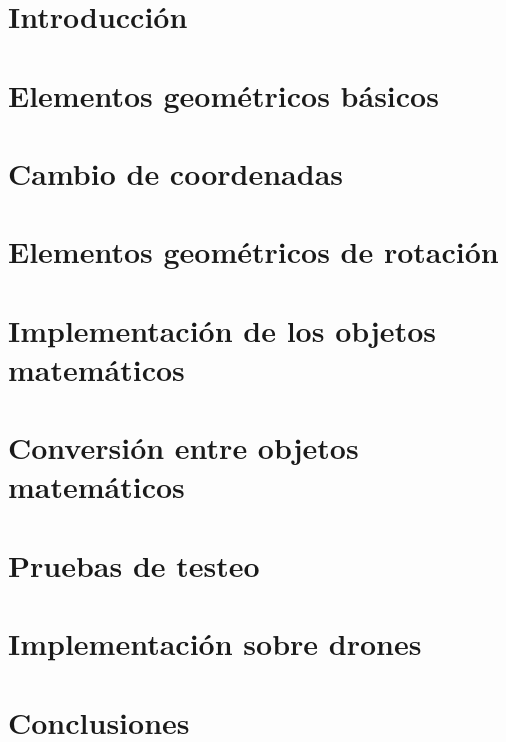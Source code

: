\documentclass[conference]{IEEEtran}
\begin{document}
\section{Introducción}


\section{Elementos geométricos básicos}


\section{Cambio de coordenadas}


\section{Elementos geométricos de rotación}


\section{Implementación de los objetos matemáticos}


\section{Conversión entre objetos matemáticos}


\section{Pruebas de testeo}


\section{Implementación sobre drones}


\section{Conclusiones}

\end{document}

